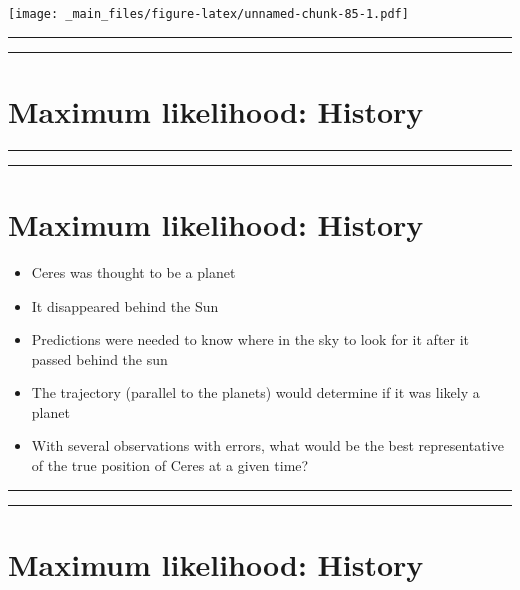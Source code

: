 \documentclass[
]{book}
\begin{document}
\texttt{[image: \_main\_files/figure-latex/unnamed-chunk-85-1.pdf]}

\begin{center}\rule{0.5\linewidth}{0.5pt}\end{center}

\begin{center}\rule{0.5\linewidth}{0.5pt}\end{center}

\hypertarget{maximum-likelihood-history}{%
\section{Maximum likelihood: History}\label{maximum-likelihood-history}}

\begin{center}\rule{0.5\linewidth}{0.5pt}\end{center}

\begin{center}\rule{0.5\linewidth}{0.5pt}\end{center}

\hypertarget{maximum-likelihood-history-1}{%
\section{Maximum likelihood: History}\label{maximum-likelihood-history-1}}

\begin{itemize}
\item
  Ceres was thought to be a planet
\item
  It disappeared behind the Sun
\item
  Predictions were needed to know where in the sky to look for it after it passed behind the sun
\item
  The trajectory (parallel to the planets) would determine if it was likely a planet
\item
  With several observations with errors, what would be the best representative of the true position of Ceres at a given time?
\end{itemize}

\begin{center}\rule{0.5\linewidth}{0.5pt}\end{center}

\begin{center}\rule{0.5\linewidth}{0.5pt}\end{center}

\hypertarget{maximum-likelihood-history-2}{%
\section{Maximum likelihood: History}\label{maximum-likelihood-history-2}}
\end{document}
